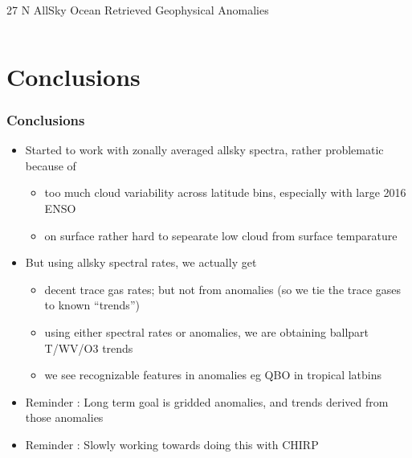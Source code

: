 \documentclass[10pt,t]{beamer}
\begin{document}
\begin{frame}{27 N AllSky Ocean Retrieved Geophysical Anomalies}
\begin{columns}
\begin{column}{0.45\columnwidth}

\end{column}
\end{columns}
\end{frame}




\section{Conclusions}
\begin{frame}
  \frametitle{Conclusions}
  \begin{itemize}
  \item Started to work with zonally averaged allsky spectra, rather problematic because of
  \begin{itemize}
    \item too much cloud variability across latitude bins, especially with large 2016 ENSO
    \item on surface rather hard to sepearate low cloud from surface temparature
  \end{itemize}
  \item But using allsky spectral rates, we actually get 
  \begin{itemize}
    \item  decent trace gas rates; but not from anomalies (so we tie the trace gases to known ``trends'')
    \item using either spectral rates or anomalies, we are obtaining ballpart T/WV/O3 trends
    \item we see recognizable features in anomalies eg QBO in tropical latbins
  \end{itemize}
  \item Reminder : Long term goal is gridded anomalies, and trends derived from those anomalies
  \item Reminder : Slowly working towards doing this with CHIRP

  \end{itemize}
\end{frame}
\end{document}
